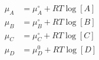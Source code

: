 \begin{eqnarray}\label{eqn:chemical-potential}
\mu_A & = \mu_A^\circ + RT\log [A] \\
\mu_B & = \mu_B^\circ + RT\log [B] \\
\mu_C & = \mu_C^\circ+ RT\log [C] \\
\mu_D & = \mu_D^0 + RT\log [D] \\
\end{eqnarray}